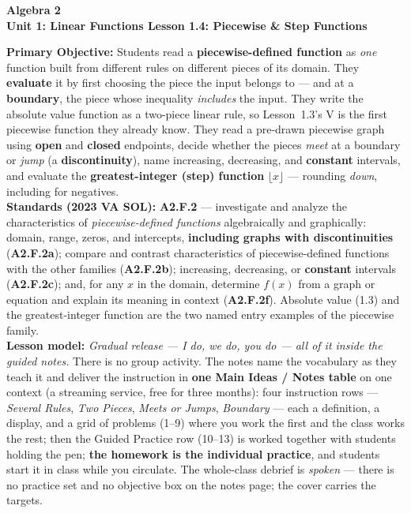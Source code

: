 \documentclass[10pt]{article}
\newcommand{\CourseName}{Algebra 2}
\newcommand{\UnitNumberName}{Unit 1: Linear Functions \quad}
\newcommand{\LessonNumberName}{Lesson 1.4: Piecewise \& Step Functions}
\begin{document}
\begin{center}
    {\Large\bfseries \CourseName \\
    {\small\bfseries \UnitNumberName \LessonNumberName}}
\end{center}

\begin{tcolorbox}[colback=forestbg, colframe=forest, boxrule=0.9pt, arc=2mm,
    left=2mm, right=2mm, top=1.5mm, bottom=1.5mm]
    \textbf{Primary Objective:} Students read a \textbf{piecewise-defined function} as \emph{one}
    function built from different rules on different pieces of its domain. They \textbf{evaluate}
    it by first choosing the piece the input belongs to --- and at a \textbf{boundary}, the piece
    whose inequality \emph{includes} the input. They write the absolute value function as a
    two-piece linear rule, so Lesson~1.3's V is the first piecewise function they already know.
    They read a pre-drawn piecewise graph using \textbf{open} and \textbf{closed} endpoints, decide
    whether the pieces \emph{meet} at a boundary or \emph{jump} (a \textbf{discontinuity}), name
    increasing, decreasing, and \textbf{constant} intervals, and evaluate the
    \textbf{greatest-integer (step) function} $\lfloor x\rfloor$ --- rounding \emph{down},
    including for negatives.
    \\[2pt]
    \textbf{Standards (2023 VA SOL):} \textbf{A2.F.2} --- investigate and analyze the
    characteristics of \emph{piecewise-defined functions} algebraically and graphically: domain,
    range, zeros, and intercepts, \textbf{including graphs with discontinuities}
    (\textbf{A2.F.2a}); compare and contrast characteristics of piecewise-defined functions with
    the other families (\textbf{A2.F.2b}); increasing, decreasing, or \textbf{constant} intervals
    (\textbf{A2.F.2c}); and, for any $x$ in the domain, determine $f(x)$ from a graph or equation
    and explain its meaning in context (\textbf{A2.F.2f}). Absolute value (1.3) and the
    greatest-integer function are the two named entry examples of the piecewise family.
    \\[2pt]
    \textbf{Lesson model:} \emph{Gradual release --- I do, we do, you do --- all of it inside the
    guided notes.} There is no group activity. The notes name the vocabulary as they teach it and
    deliver the instruction in \textbf{one Main Ideas / Notes table} on one context (a streaming
    service, free for three months): four instruction rows --- \emph{Several Rules}, \emph{Two
    Pieces}, \emph{Meets or Jumps}, \emph{Boundary} --- each a definition, a display, and a grid
    of problems (1--9) where you work the first and the class works the rest; then the Guided
    Practice row (10--13) is worked together with students holding the pen;
    \textbf{the homework is the individual practice}, and students start it in class while you
    circulate. The whole-class debrief is \emph{spoken} --- there is no practice set and no
    objective box on the notes page; the cover carries the targets.
\end{tcolorbox}
\end{document}
